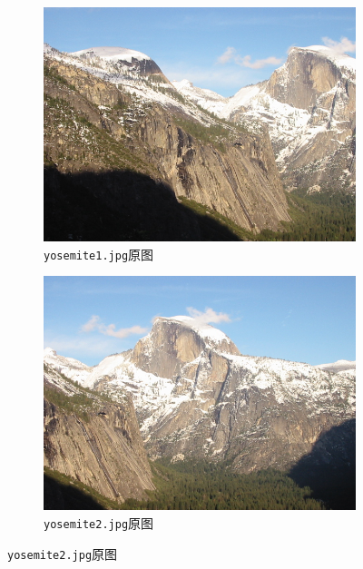\documentclass[a4paper, utf8]{ctexart}
\begin{document}
	\begin{figure}[htbp]
		\centering
		\begin{subfigure}{.45\textwidth}
			\centering
			\includegraphics[height=.13\textheight]{./figure/yosemite1.jpg}
			\caption{\texttt{yosemite1.jpg}原图}
		\end{subfigure}
		\begin{subfigure}{.45\textwidth}
			\centering
			\includegraphics[height=.13\textheight]{./figure/yosemite2.jpg}
			\caption{\texttt{yosemite2.jpg}原图}
		\end{subfigure}
		

\end{figure}
\end{document}
